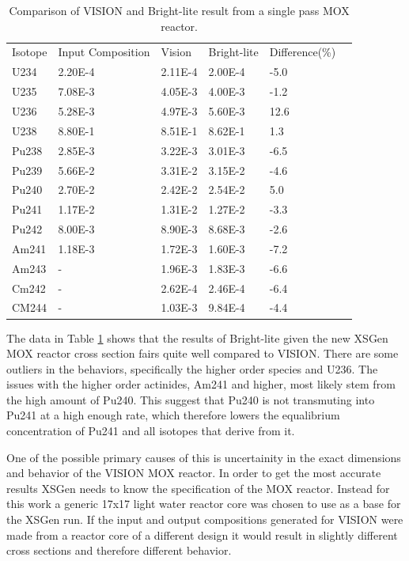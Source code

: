 \documentclass{article}
\begin{document}
\begin{table}[!htb]
\centering
\caption{Comparison of VISION and Bright-lite result from a single pass MOX reactor.}
\label{tab:g}
\begin{tabular}{llllll}
Isotope & Input Composition & Vision & Bright-lite & Difference(\%) \\
U234 & 2.20E-4 & 2.11E-4 & 2.00E-4 & -5.0\\
U235 & 7.08E-3 & 4.05E-3 & 4.00E-3 & -1.2\\
U236 & 5.28E-3 & 4.97E-3 & 5.60E-3 & 12.6\\
U238 & 8.80E-1 & 8.51E-1 & 8.62E-1 & 1.3\\
Pu238 & 2.85E-3 & 3.22E-3 & 3.01E-3 & -6.5\\
Pu239 & 5.66E-2 & 3.31E-2 & 3.15E-2 & -4.6\\
Pu240 & 2.70E-2 & 2.42E-2 & 2.54E-2 & 5.0\\
Pu241 & 1.17E-2 & 1.31E-2 & 1.27E-2 & -3.3\\
Pu242 & 8.00E-3 & 8.90E-3 & 8.68E-3 & -2.6\\
Am241 & 1.18E-3 & 1.72E-3 & 1.60E-3 & -7.2\\
Am243 & - & 1.96E-3 & 1.83E-3 & -6.6\\
Cm242 & - & 2.62E-4 & 2.46E-4 & -6.4\\
CM244 & - & 1.03E-3 & 9.84E-4 & -4.4
\end{tabular}
\end{table}

The data in Table \ref{tab:g} shows that the results of Bright-lite given the new XSGen MOX reactor cross section fairs quite well compared to VISION. There are some outliers in the behaviors, specifically the higher order species and U236. The issues with the higher order actinides, Am241 and higher, most likely stem from the high amount of Pu240. This suggest that Pu240 is not transmuting into Pu241 at a high enough rate, which therefore lowers the equalibrium concentration of Pu241 and all isotopes that derive from it.

One of the possible primary causes of this is uncertainity in the exact dimensions and behavior of the VISION MOX reactor. In order to get the most accurate results XSGen needs to know the specification of the MOX reactor. Instead for this work a generic 17x17 light water reactor core was chosen to use as a base for the XSGen run. If the input and output compositions generated for VISION were made from a reactor core of a different design it would result in slightly different cross sections and therefore different behavior.
\end{document}
